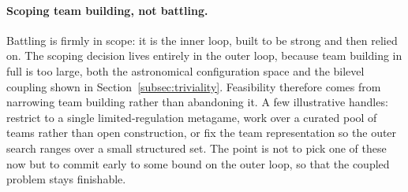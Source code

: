 \paragraph{Scoping team building, not battling.}
Battling is firmly in scope: it is the inner loop, built to be strong and then
relied on. The scoping decision lives entirely in the outer loop, because team
building in full is too large, both the astronomical configuration space and the
bilevel coupling shown in Section~\ref{subsec:triviality}. Feasibility therefore
comes from narrowing team building rather than abandoning it. A few illustrative
handles: restrict to a single limited-regulation metagame, work over a curated
pool of teams rather than open construction, or fix the team representation so the
outer search ranges over a small structured set. The point is not to pick one of
these now but to commit early to some bound on the outer loop, so that the coupled
problem stays finishable.

\newpage
